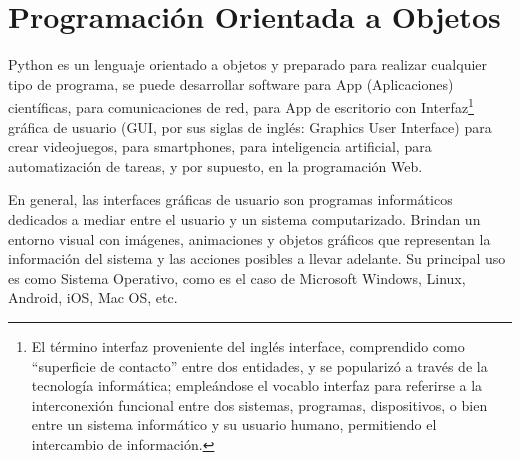 










\section{Programación Orientada a Objetos}\label{oop}



Python es un lenguaje orientado a objetos y preparado para realizar cualquier tipo de programa, se puede desarrollar software para App (Aplicaciones) científicas, para comunicaciones de red, para App de escritorio con Interfaz\footnote{\scriptsize{El término interfaz proveniente del inglés interface, comprendido como “superficie de contacto” entre dos entidades, y se popularizó a través de la tecnología informática; empleándose el vocablo interfaz para referirse  a la interconexión funcional entre dos sistemas, programas, dispositivos,  o bien entre un sistema informático y su usuario humano, permitiendo el intercambio de información.}} gráfica de usuario (GUI, por sus siglas de inglés: Graphics User Interface) para crear  videojuegos, para smartphones, para inteligencia artificial, para automatización de tareas,
y por supuesto, en la programación Web. 


En general, las interfaces gráficas de usuario  son programas informáticos dedicados a mediar entre el usuario y un sistema computarizado. Brindan un entorno visual con imágenes, animaciones y objetos gráficos que representan la información del sistema y las acciones posibles a llevar adelante. Su principal uso es como Sistema Operativo, como es el caso de Microsoft  Windows,  Linux, Android, iOS, Mac OS,  etc.\\


